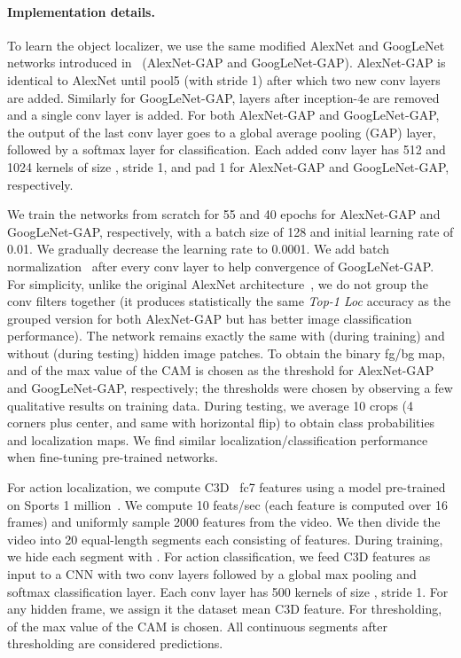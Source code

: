 \paragraph{Implementation details.} To learn the object localizer, we use the same modified AlexNet and GoogLeNet networks introduced in~\cite{zhou-cvpr2016} (AlexNet-GAP and  GoogLeNet-GAP).  AlexNet-GAP is identical to AlexNet until pool5 (with stride 1) after which two new conv layers are added.  Similarly for GoogLeNet-GAP, layers after inception-4e are removed and a single conv layer is added.  For both AlexNet-GAP and GoogLeNet-GAP, the output of the last conv layer goes to a global average pooling (GAP) layer, followed by a softmax layer for classification.  Each added conv layer has 512 and 1024 kernels of size , stride 1, and pad 1 for AlexNet-GAP and  GoogLeNet-GAP, respectively. 

We train the networks from scratch for 55 and 40 epochs for AlexNet-GAP and GoogLeNet-GAP, respectively, with a batch size of 128 and initial learning rate of 0.01. We gradually decrease the learning rate to 0.0001.  We add batch normalization~\cite{bn} after every conv layer to help convergence of GoogLeNet-GAP. For simplicity, unlike the original AlexNet architecture~\cite{krizhevsky-nips2012}, we do not group the conv filters together (it produces statistically the same \emph{Top-1 Loc} accuracy as the grouped version for both AlexNet-GAP but has better image classification performance). The network remains exactly the same with (during training) and without (during testing) hidden image patches. To obtain the binary fg/bg map,  and  of the max value of the CAM is chosen as the threshold for AlexNet-GAP and GoogLeNet-GAP, respectively; the thresholds were chosen by observing a few qualitative results on training data.  During testing, we average 10 crops (4 corners plus center, and same with horizontal flip) to obtain class probabilities and localization maps.  We find similar localization/classification performance when fine-tuning pre-trained networks.

For action localization, we compute C3D~\cite{tran-iccv2015} fc7 features using a model pre-trained on Sports 1 million~\cite{karpathy-CVPR14}. We compute 10 feats/sec (each feature is computed over 16 frames) and uniformly sample 2000 features from the video. We then divide the video into 20 equal-length segments each consisting of  features.  During training, we hide each segment with .  For action classification, we feed C3D features as input to a CNN with two conv layers followed by a global max pooling and softmax classification layer. Each conv layer has 500 kernels of size , stride 1. For any hidden frame, we assign it the dataset mean C3D feature. For thresholding,  of the max value of the CAM is chosen. All continuous segments after thresholding are considered predictions.

